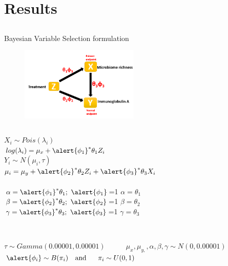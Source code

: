 \documentclass[a4paper,9pt]{beamer}
\begin{document}
\section{Results}
\subsection{}
\begin{frame}{\huge{Bayesian Variable Selection formulation}}
\small
\begin{figure}[H]
\centering
\includegraphics[scale=0.4,height=3.5cm]{hm.PNG}
\end{figure}

\begin{columns}
$X_i \sim Pois(\lambda_i)$\\
$log(\lambda_i) = \mu_x + \alert{ \phi_1} ^{*}\theta_1 Z_i$ \\
\vspace{0.1in}
$Y_i \sim N(\mu_i,\tau)$\\
$\mu_i = \mu_y + \alert{ \phi_2} ^{*}\theta_2 Z_i + \alert{ \phi_3} ^{*} \theta_3 X_i$ \\ \\

 $\alpha = \alert{ \phi_1} ^{*}\theta_1; \ \alert{ \phi_1}$=1  $\alpha = \theta_1$\\
$\beta = \alert{ \phi_2} ^{*}\theta_2; \ \alert{ \phi_2}$=1  $\beta = \theta_2$\\
$\gamma = \alert{ \phi_3} ^{*}\theta_3; \ \alert{ \phi_3}$=1  $\gamma = \theta_3$
\end{columns}
\\
$\tau \sim Gamma(0.00001, 0.00001) \ \ \ \ \ \ \ \ \ \ \ \ \ \mu_{x}, \mu_{y, }, \alpha , \beta, \gamma \sim N(0, 0.00001)$\\

$\alert{ \phi_i} \sim B(\pi_i) \ \ \ \text{and} \ \ \ \ \ \pi_i \sim U(0,1)$\\

\end{frame}
\end{document}
